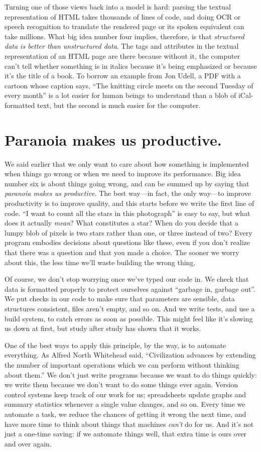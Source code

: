 \documentclass[10pt,letterpaper]{article}
\newcommand{\rulemajor}[1]{\section{#1}}
\begin{document}
Turning one of those views back into a model is hard: parsing the textual
representation of HTML takes thousands of lines of code, and doing OCR or speech
recognition to translate the rendered page or its spoken equivalent can take
millions.  What big idea number four implies, therefore, is that
\emph{structured data is better than unstructured data}.  The tags and
attributes in the textual representation of an HTML page are there because
without it, the computer can't tell whether something is in italics because it's
being emphasized or because it's the title of a book.  To borrow an example from
Jon Udell, a PDF with a cartoon whose caption says, ``The knitting circle meets
on the second Tuesday of every month'' is a lot easier for human beings to
understand than a blob of iCal-formatted text, but the second is much easier for
the computer.

\rulemajor{Paranoia makes us productive.}

We said earlier that we only want to care about how something is implemented
when things go wrong or when we need to improve its performance.  Big idea
number six is about things going wrong, and can be summed up by saying that
\emph{paranoia makes us productive}.  The best way—in fact, the only way—to
improve productivity is to improve quality, and this starts before we write the
first line of code.  ``I want to count all the stars in this photograph'' is easy
to say, but what does it actually \emph{mean}?  What constitutes a star?  When
do you decide that a lumpy blob of pixels is two stars rather than one, or three
instead of two?  Every program embodies decisions about questions like these,
even if you don't realize that there was a question and that you made a choice.
The sooner we worry about this, the less time we'll waste building the wrong
thing.

Of course, we don't stop worrying once we've typed our code in.  We check that
data is formatted properly to protect ourselves against ``garbage in, garbage
out''.  We put checks in our code to make sure that parameters are sensible, data
structures consistent, files aren't empty, and so on.  And we write tests, and
use a build system, to catch errors as soon as possible.  This might feel like
it's slowing us down at first, but study after study has shown that it works.

One of the best ways to apply this principle, by the way, is to automate
everything.  As Alfred North Whitehead said, ``Civilization advances by
extending the number of important operations which we can perform without
thinking about them.''  We don't just write programs because we want to do
things quickly: we write them because we don't want to do some things ever
again.  Version control systems keep track of our work for us; spreadsheets
update graphs and summary statistics whenever a single value changes, and so on.
Every time we automate a task, we reduce the chances of getting it wrong the
next time, and have more time to think about things that machines \emph{can't}
do for us.  And it's not just a one-time saving: if we automate things well,
that extra time is ours over and over again.
\end{document}

